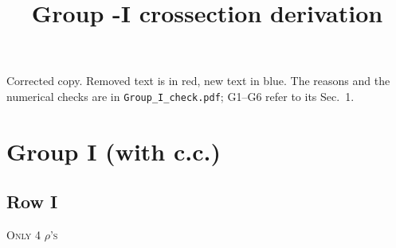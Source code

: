 \documentclass[9pt]{article}
\title{Group -I crossection derivation}
\author{}
\date{}
\numberwithin{equation}{section}
\begin{document}
\maketitle
\begingroup\color{blue}\noindent Corrected copy. Removed text is in red, new text in blue. The reasons and the numerical checks are in \texttt{Group\_I\_check.pdf}; G1--G6 refer to its Sec.~1.\par\endgroup
\section{Group I (with c.c.)}
\subsection{Row I\,}
\textsc{Only 4 $\rho$'s}
\end{document}
